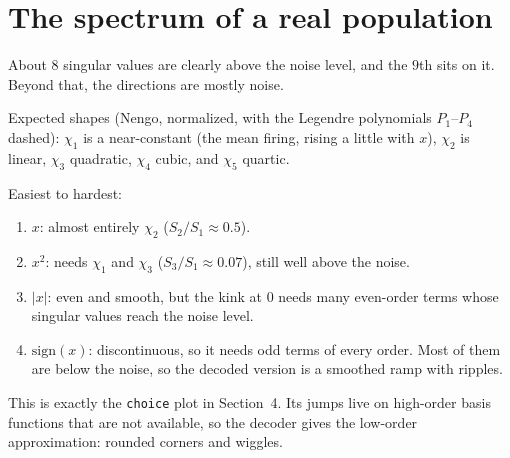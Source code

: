 \documentclass[11pt,letterpaper]{article}
\newcommand{\ans}[1]{\par\vspace{4pt}{\bfseries #1}\quad}
\begin{document}
\section{The spectrum of a real population}

\ans{Q1}
About $8$ singular values are clearly above the noise level, and the $9$th sits on it. Beyond that, the directions are mostly noise.

Expected shapes (Nengo, normalized, with the Legendre polynomials $P_1$--$P_4$ dashed): $\chi_1$ is a near-constant (the mean firing, rising a little with $x$), $\chi_2$ is linear, $\chi_3$ quadratic, $\chi_4$ cubic, and $\chi_5$ quartic.
\begin{center}
\end{center}
Easiest to hardest:
\begin{enumerate}[label=(\arabic*), leftmargin=1.8em, itemsep=1pt, topsep=2pt]
\item $x$: almost entirely $\chi_2$ ($S_2/S_1 \approx 0.5$).
\item $x^2$: needs $\chi_1$ and $\chi_3$ ($S_3/S_1 \approx 0.07$), still well above the noise.
\item $|x|$: even and smooth, but the kink at $0$ needs many even-order terms whose singular values reach the noise level.
\item $\mathrm{sign}(x)$: discontinuous, so it needs odd terms of every order. Most of them are below the noise, so the decoded version is a smoothed ramp with ripples.
\end{enumerate}
This is exactly the \texttt{choice} plot in Section~4. Its jumps live on high-order basis functions that are not available, so the decoder gives the low-order approximation: rounded corners and wiggles.
\end{document}
